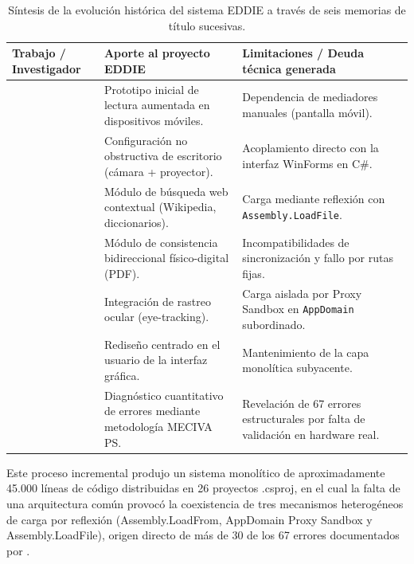 \begin{table}[htbp]
    \centering
    \caption{Síntesis de la evolución histórica del sistema EDDIE a través de seis memorias de título sucesivas.}
    \label{tab:evolucion_eddie}
    \small
    \begin{tabularx}{\textwidth}{|>{\raggedright\arraybackslash}p{3.0cm}|>{\raggedright\arraybackslash}X|>{\raggedright\arraybackslash}X|}
        \hline
        \textbf{Trabajo / Investigador} & \textbf{Aporte al proyecto EDDIE} & \textbf{Limitaciones / Deuda técnica generada} \\ \hline
        \cite{carrasco2017diseno} & Prototipo inicial de lectura aumentada en dispositivos móviles. & Dependencia de mediadores manuales (pantalla móvil). \\ \hline
        \cite{contreras2019desarrollo} & Configuración no obstructiva de escritorio (cámara + proyector). & Acoplamiento directo con la interfaz WinForms en C\#. \\ \hline
        \cite{montanares2019desarrollo} & Módulo de búsqueda web contextual (Wikipedia, diccionarios). & Carga mediante reflexión con \texttt{Assembly.LoadFile}. \\ \hline
        \cite{pezoa2020implementacion} & Módulo de consistencia bidireccional físico-digital (PDF). & Incompatibilidades de sincronización y fallo por rutas fijas. \\ \hline
        \cite{estay2020integracion} & Integración de rastreo ocular (eye-tracking). & Carga aislada por Proxy Sandbox en \texttt{AppDomain} subordinado. \\ \hline
        \cite{santibanez2020rediseno} & Rediseño centrado en el usuario de la interfaz gráfica. & Mantenimiento de la capa monolítica subyacente. \\ \hline
        \cite{ibaceta2023evaluacion} & Diagnóstico cuantitativo de errores mediante metodología MECIVA PS. & Revelación de 67 errores estructurales por falta de validación en hardware real. \\ \hline
    \end{tabularx}
\end{table}

Este proceso incremental produjo un sistema monolítico de aproximadamente 45.000 líneas de código distribuidas en 26 proyectos .csproj, en el cual la falta de una arquitectura común provocó la coexistencia de tres mecanismos heterogéneos de carga por reflexión (Assembly.LoadFrom, AppDomain Proxy Sandbox y Assembly.LoadFile), origen directo de más de 30 de los 67 errores documentados por \cite{ibaceta2023evaluacion}.

